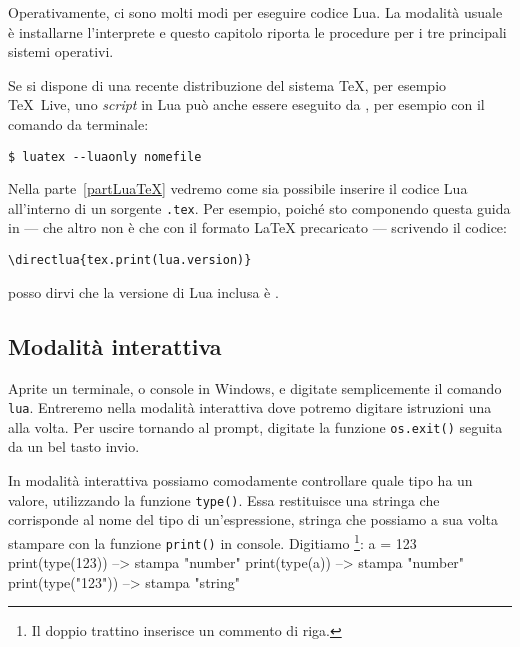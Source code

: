 Operativamente, ci sono molti modi per eseguire codice Lua. La modalità usuale
è installarne l'interprete e questo capitolo riporta le procedure per i tre
principali sistemi operativi.

Se si dispone di una recente distribuzione del sistema \TeX{}, per esempio
TeX~Live, uno \emph{script} in Lua può anche essere eseguito da \LuaTeX{}, per
esempio con il comando da terminale:
\begin{Verbatim}
$ luatex --luaonly nomefile
\end{Verbatim}

Nella parte~\ref{partLuaTeX} vedremo come sia possibile inserire il codice Lua
all'interno di un sorgente \texttt{.tex}. Per esempio, poiché sto componendo
questa guida in \LuaLaTeX{} --- che altro non è che \LuaTeX{} con il formato
\LaTeX{} precaricato --- scrivendo il codice:
\begin{Verbatim}
\directlua{tex.print(lua.version)}
\end{Verbatim}
posso dirvi che la versione di Lua inclusa è .


\subsection{Modalità interattiva}

Aprite un terminale, o console in Windows, e digitate semplicemente il comando
\texttt{lua}. Entreremo nella modalità interattiva dove potremo
digitare istruzioni una alla volta. Per uscire tornando al prompt, digitate la
funzione \texttt{os.exit()} seguita da un bel tasto invio.

In modalità interattiva possiamo comodamente controllare quale tipo ha un
valore, utilizzando la funzione \texttt{type()}. Essa restituisce una stringa
che corrisponde al nome del tipo di un'espressione, stringa che possiamo a sua
volta stampare con la funzione \texttt{print()} in console. Digitiamo
\footnote{Il doppio trattino inserisce un commento di riga.}:
\lines
a = 123
print(type(123))    --> stampa "number"
print(type(a))      --> stampa "number"
print(type("123"))  --> stampa "string"
\endlines
{}



